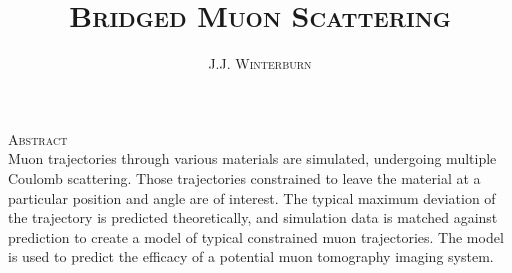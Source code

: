 \documentclass{article}
\numberwithin{equation}{section}
\begin{document}
\title{\Huge{\textsc{Bridged Muon Scattering}}}
\author{\textsc{J.J. Winterburn}}
\date{}

\maketitle
\thispagestyle{empty}
\vspace{1in}

\centering
\textsc{Abstract}\\
\vspace{0.2in}
Muon trajectories through various materials are simulated, undergoing multiple Coulomb scattering. Those trajectories constrained to leave the material at a particular position and angle are of interest. The typical maximum deviation of the trajectory is predicted theoretically, and simulation data is matched against prediction to create a model of typical constrained muon trajectories. The model is used to predict the efficacy of a potential muon tomography imaging system.

\clearpage

\raggedright
\end{document}
